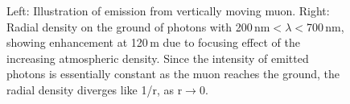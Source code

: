 \begin{figure}[t]
\caption{\label{FIG::TECHNIQUE::CERENKOVMUON} Left: Illustration of 
\Cerenkov emission from vertically moving muon. Right: Radial density 
on the ground of \Cerenkov photons with 200\,nm$<\lambda<$700\,nm,
showing enhancement at 120\,m due to focusing effect of the
increasing atmospheric density. Since the intensity of emitted photons
is essentially constant as the muon reaches the ground, the radial
density diverges like 1/r, as r$\rightarrow$0. }
\end{figure}

